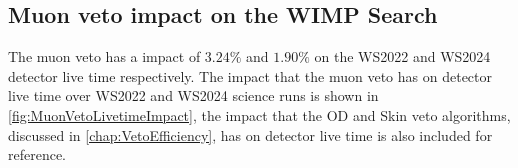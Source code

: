 \subsection{Muon veto impact on the WIMP Search}
The muon veto has a impact of $3.24\%$ and $1.90\%$ on the WS2022 and WS2024 detector live time respectively. The impact that the muon veto has on detector live time over WS2022 and WS2024 science runs is shown in \autoref{fig:MuonVetoLivetimeImpact}, the impact that the OD and Skin veto algorithms, discussed in \autoref{chap:VetoEfficiency}, has on detector live time is also included for reference.

